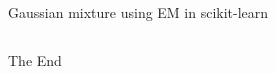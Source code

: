 \documentclass[aspectratio=169]{beamer}
\begin{document}
\begin{frame}[fragile]{Gaussian mixture using EM in scikit-learn}
\inputminted{python}{example_sklearn_em.py}
\end{frame}


%     
%     


\begin{frame}
    \Huge{\centerline{The End}}
\end{frame}
\end{document}
